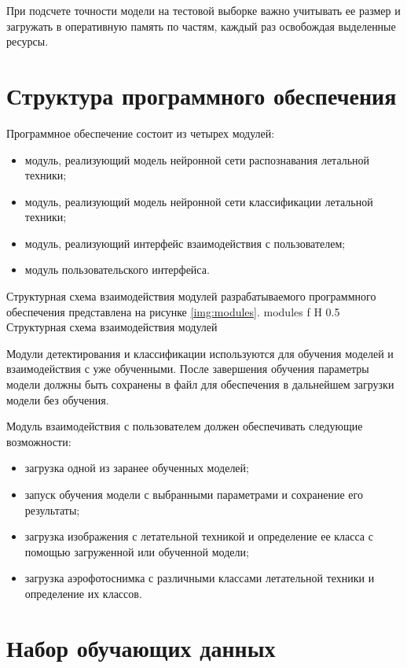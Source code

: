 При подсчете точности модели на тестовой выборке важно учитывать ее размер и загружать в оперативную память по частям, каждый раз освобождая выделенные ресурсы.

\section{Структура программного обеспечения}

Программное обеспечение состоит из четырех модулей:
\begin{itemize}
	\item модуль, реализующий модель нейронной сети распознавания летальной техники;
	\item модуль, реализующий модель нейронной сети классификации летальной техники;
	\item модуль, реализующий интерфейс взаимодействия с пользователем;
	\item модуль пользовательского интерфейса.
\end{itemize}

Структурная схема взаимодействия модулей разрабатываемого программного обеспечения представлена на рисунке \ref{img:modules}.
{modules} %
{f} %
{H} %
{0.5\textwidth} %
{Структурная схема взаимодействия модулей} %

Модули детектирования и классификации используются для обучения моделей и взаимодействия с уже обученными. После завершения обучения параметры модели должны быть сохранены в файл для обеспечения в дальнейшем загрузки модели без обучения.

Модуль взаимодействия с пользователем должен обеспечивать следующие возможности:
\begin{itemize}
	\item загрузка одной из заранее обученных моделей;
	\item запуск обучения модели с выбранными параметрами и сохранение его результаты;
	\item загрузка изображения с летательной техникой и определение ее класса с помощью загруженной или обученной модели;
	\item загрузка аэрофотоснимка с различными классами летательной техники и определение их классов.
\end{itemize} 

\section{Набор обучающих данных}

